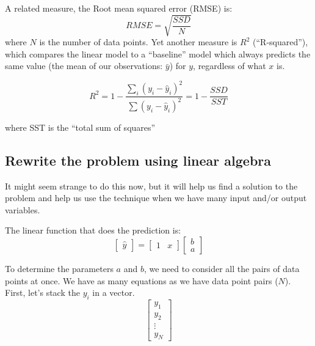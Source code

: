 \documentclass[11pt]{article}
\newcommand\yhat{\hat{y}}
\begin{document}
A related measure, the Root mean squared error (RMSE) is:
\begin{equation}
    RMSE = \sqrt{\frac{SSD}{N}}
\end{equation}
where $N$ is the number of data points.
Yet another measure is $R^2$ (``R-squared''), which compares the linear
model to a ``baseline'' model which always predicts the same value (the
mean of our observations: $\bar{y}$) for $y$, regardless of what $x$ is.  

\begin{equation}
    R^2 = 
        1 - \frac{ \sum_i (y_i - \hat{y}_i)^2 }{ \sum (y_i - \hat{y}_i)^2} = 
        1 - \frac{ SSD }{ SST }
\end{equation}

where SST is the ``total sum of squares''


\subsection{Rewrite the problem using linear algebra}

It might seem strange to do this now, but it will help us find a solution
to the problem and help us use the technique when we have many input
and/or output variables.

The linear function that does the prediction is:
\begin{equation}
    \begin{bmatrix}
        \yhat
    \end{bmatrix}
    = 
    \begin{bmatrix}
        1 & x 
    \end{bmatrix}
    \begin{bmatrix}
        b \\ a
    \end{bmatrix}
\end{equation}

To determine the parameters $a$ and $b$, we need to consider all the
pairs of data points at once. We have as many equations as we have data
point pairs ($N$).  First, let's stack the $y_i$ in a vector.
\begin{equation}
    \begin{bmatrix}
        y_1  \\
        y_2 \\
        \vdots \\
        y_N
    \end{bmatrix}
\end{equation}
\end{document}
